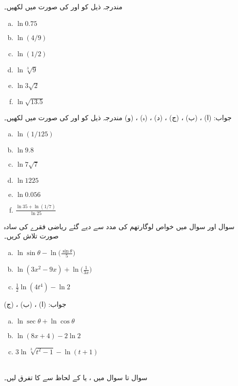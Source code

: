 مندرجہ ذیل کو  اور  کی صورت میں لکھیں۔
\begin{multicols}{3}
\begin{enumerate}[a.]
\item
$\ln 0.75$
\item
$\ln (4/9)$
\item
$\ln (1/2)$
\item
$\ln\sqrt[3]{9}$
\item
$\ln 3\sqrt{2}$
\item
$\ln\sqrt{13.5}$
\end{enumerate}
\end{multicols}
جواب:\quad
(ا) ، (ب) ، (ج) ، (د) ، (ہ) ، (و) 
مندرجہ ذیل کو  اور  کی صورت میں لکھیں۔
\begin{multicols}{3}
\begin{enumerate}[a.]
\item
$\ln (1/125)$
\item
$\ln 9.8$
\item
$\ln 7\sqrt{7}$
\item
$\ln1225$
\item
$\ln 0.056$
\item
$ \tfrac{\ln 35+\ln(1/7)}{\ln 25}$
\end{enumerate}
\end{multicols}
سوال  اور سوال  میں خواص لوگارتھم کی مدد سے دیے گئے ریاضی فقرے کی سادہ صورت تلاش کریں۔

\begin{multicols}{3}
\begin{enumerate}[a.]
\item
$\ln \sin\theta-\ln \big(\frac{\sin\theta}{5}\big)$
\item
$\ln(3x^2-9x)+\ln\big(\frac{1}{3x}\big)$
\item
$\frac{1}{2}\ln(4t^4)-\ln 2$
\end{enumerate}
\end{multicols}
جواب:\quad
(ا) ، (ب) ، (ج) 
\begin{multicols}{2}
\begin{enumerate}[a.]
\item
$\ln \sec\theta+\ln\cos\theta$
\item
$\ln(8x+4)-2\ln2$
\item
$3\ln\sqrt[3]{t^2-1}-\ln(t+1)$
\end{enumerate}
\end{multicols}
\\
سوال  تا سوال  میں ،  یا  کے لحاظ سے  کا تفرق لیں۔

